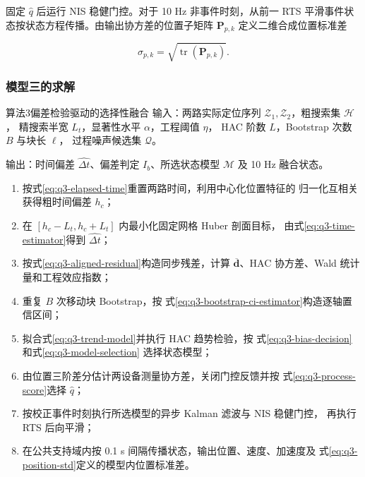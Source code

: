 固定 \(\widehat q\) 后运行 NIS 稳健门控。对于 10 Hz 非事件时刻，从前一
RTS 平滑事件状态按状态方程传播。由输出协方差的位置子矩阵
\(\mathbf P_{p,k}\) 定义二维合成位置标准差

\begin{equation}
\sigma_{p,k}=
\sqrt{\operatorname{tr}(\mathbf P_{p,k})}.
\label{eq:q3-position-std}
\end{equation}

\subsubsection{模型三的求解}\label{sec:q3-solution}

\begin{pseudocodeblock}{算法3\quad 偏差检验驱动的选择性融合}
{\heiti 输入：}两路实际定位序列
\(\mathcal Z_1,\mathcal Z_2\)，粗搜索集 \(\mathcal H\)，
精搜索半宽 \(L_t\)，显著性水平 \(\alpha\)，工程阈值 \(\eta\)，
HAC 阶数 \(L\)，Bootstrap 次数 \(B\) 与块长 \(\ell\)，
过程噪声候选集 \(\mathcal Q\)。\par
{\heiti 输出：}时间偏差 \(\widehat{\Delta t}\)、偏差判定
\(I_b\)、所选状态模型 \(\mathcal M\) 及 10 Hz 融合状态。\par
\begin{enumerate}[label={\heiti 步骤~\arabic*:},leftmargin=5.5em,itemsep=1pt,topsep=3pt]
  \item 按式\eqref{eq:q3-elapsed-time}重置两路时间，利用中心化位置特征的
  归一化互相关获得粗时间偏差 \(h_c\)；
  \item 在 \([h_c-L_t,h_c+L_t]\) 内最小化固定网格 Huber 剖面目标，
  由式\eqref{eq:q3-time-estimator}得到 \(\widehat{\Delta t}\)；
  \item 按式\eqref{eq:q3-aligned-residual}构造同步残差，计算
  \(\overline{\mathbf d}\)、HAC 协方差、Wald 统计量和工程效应指数；
  \item 重复 \(B\) 次移动块 Bootstrap，按
  式\eqref{eq:q3-bootstrap-ci-estimator}构造逐轴置信区间；
  \item 拟合式\eqref{eq:q3-trend-model}并执行 HAC 趋势检验，按
  式\eqref{eq:q3-bias-decision}和式\eqref{eq:q3-model-selection}
  选择状态模型；
  \item 由位置三阶差分估计两设备测量协方差，关闭门控反馈并按
  式\eqref{eq:q3-process-score}选择 \(\widehat q\)；
  \item 按校正事件时刻执行所选模型的异步 Kalman 滤波与 NIS 稳健门控，
  再执行 RTS 后向平滑；
  \item 在公共支持域内按 0.1 s 间隔传播状态，输出位置、速度、加速度及
  式\eqref{eq:q3-position-std}定义的模型内位置标准差。
\end{enumerate}
\end{pseudocodeblock}

